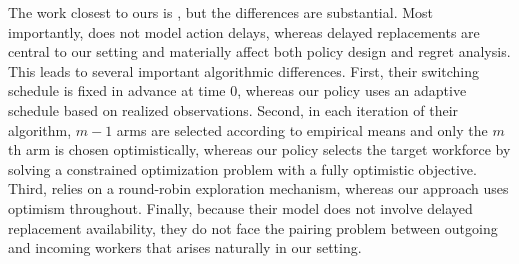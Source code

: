 \documentclass[opre,blindrev]{informs3}
\begin{document}
%

The work closest to ours is \cite{agrawal1990switching}, but the differences are substantial. Most importantly, \cite{agrawal1990switching} does not model action delays, whereas delayed replacements are central to our setting and materially affect both policy design and regret analysis. This leads to several important algorithmic differences.
First, their switching schedule is fixed in advance at time 0, whereas our policy uses an adaptive schedule based on realized observations. Second, in each iteration of their algorithm, \(m-1\) arms are selected according to empirical means and only the \(m\)th arm is chosen optimistically, whereas our policy selects the target workforce by solving a constrained optimization problem with a fully optimistic objective. Third, \cite{agrawal1990switching} relies on a round-robin exploration mechanism, whereas our approach uses optimism throughout. Finally, because their model does not involve delayed replacement availability, they do not face the pairing problem between outgoing and incoming workers that arises naturally in our setting.
\end{document}
